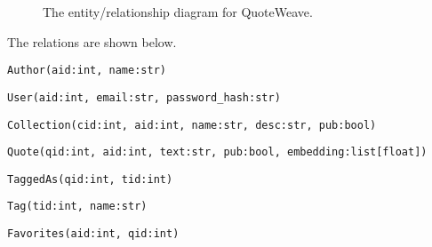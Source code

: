 \documentclass{article}
\begin{document}
\begin{figure}
  \caption{The entity/relationship diagram for QuoteWeave.\label{fig:er}}
\end{figure}

The relations are shown below.

\texttt{Author(aid:int, name:str)}

\texttt{User(aid:int, email:str, password\_hash:str)}

\texttt{Collection(cid:int, aid:int, name:str, desc:str, pub:bool)}

\texttt{Quote(qid:int, aid:int, text:str, pub:bool, embedding:list[float])}

\texttt{TaggedAs(qid:int, tid:int)}

\texttt{Tag(tid:int, name:str)}

\texttt{Favorites(aid:int, qid:int)}
\end{document}
